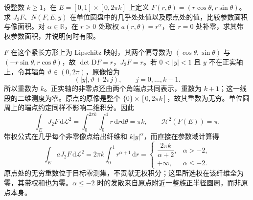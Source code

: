 \begin{exercise}\label{g3:ex:polar-area-multiplicity}
	设整数 \(k\ge1\)，在 \(E=[0,1]\times[0,2\pi k]\) 上定义 \(F(r,\theta)=(r\cos\theta,r\sin\theta)\)。求 \(J_2F\)、\(N(F,E,y)\) 在单位圆盘中的几乎处处值以及原点处的值，比较参数面积与像面积。对 \(\alpha\in\mathbb R\)，在 \(r>0\) 处取权 \(a(r,\theta)=r^\alpha\)，在 \(r=0\) 处补零，求其带权参数面积，并说明何时有限。
\end{exercise}
\begin{solution}
	\(F\) 在这个紧长方形上为 Lipschitz 映射，其两个偏导数为 \((\cos\theta,\sin\theta)\) 与 \((-r\sin\theta,r\cos\theta)\)，故 \(\det\mathrm DF=r\)，\(J_2F=r\)。若 \(0<|y|<1\) 且 \(y\) 不在正实轴上，令其辐角 \(\vartheta\in(0,2\pi)\)，原像恰为
	\[
		(|y|,\vartheta+2\pi j),\qquad j=0,\ldots,k-1.
	\]
	所以重数为 \(k\)。正实轴的非零点还由两个角端点共同表示，重数为 \(k+1\)；这一线段的二维测度为零。原点的原像是整个 \(\{0\}\times[0,2\pi k]\)，故其重数为无穷。单位圆周上的端点约定同样不影响二维积分。因此
	\[
		\int_EJ_2F\,\mathrm d\mathcal L^2
		=\int_0^{2\pi k}\int_0^1r\,\mathrm dr\mathrm d\theta
		=\pi k,
		\qquad\mathcal H^2(F(E))=\pi.
	\]
	带权公式在几乎每个非零像点给出纤维和 \(k|y|^\alpha\)，而直接在参数域计算得
	\[
		\int_EaJ_2F\,\mathrm d\mathcal L^2
		=2\pi k\int_0^1r^{\alpha+1}\,\mathrm dr
		=\begin{cases}
			\dfrac{2\pi k}{\alpha+2},&\alpha>-2,\\[3pt]
			+\infty,&\alpha\le-2.
		\end{cases}
	\]
	原点处的无穷重数位于目标零测集，不贡献无权积分；这里所选权在该纤维全为零，其带权和也为零。\(\alpha\le-2\) 时的发散来自原点附近一整族正半径圆周，而非原点本身。
\end{solution}

